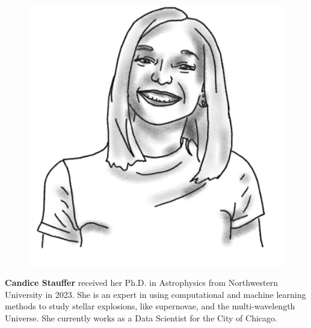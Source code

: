 \begin{figure}
\vspace{-1.2\intextsep}
\includegraphics[width=0.9\linewidth]{portraits/candice.png}
\end{figure}
\textbf{Candice Stauffer} received her Ph.D. in Astrophysics from Northwestern University in 2023. She is an expert in using computational and machine learning methods to study stellar explosions, like supernovae, and the multi-wavelength Universe. She currently works as a Data Scientist for the City of Chicago. \\
\\


